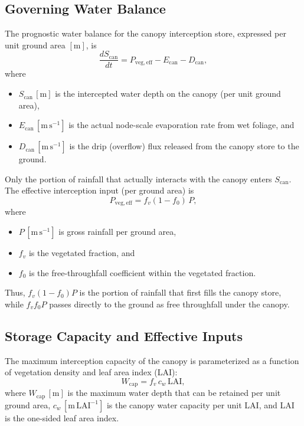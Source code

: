 \documentclass[12pt]{article}
\begin{document}
\subsection{Governing Water Balance}

The prognostic water balance for the canopy interception store, expressed per unit ground area \([\mathrm{m}]\), is
\begin{equation}
\frac{dS_{\mathrm{can}}}{dt}
  = P_{\mathrm{veg,eff}} - E_{\mathrm{can}} - D_{\mathrm{can}},
\label{eq:canopy_balance}
\end{equation}
where
\begin{itemize}
  \item \(S_{\mathrm{can}}\,[\mathrm{m}]\) is the intercepted water depth on the canopy (per unit ground area),
  \item \(E_{\mathrm{can}}\,[\mathrm{m\,s^{-1}}]\) is the actual node-scale evaporation rate from wet foliage, and
  \item \(D_{\mathrm{can}}\,[\mathrm{m\,s^{-1}}]\) is the drip (overflow) flux released from the canopy store to the ground.
\end{itemize}

Only the portion of rainfall that actually interacts with the canopy enters \(S_{\mathrm{can}}\).
The effective interception input (per ground area) is
\begin{equation}
P_{\mathrm{veg,eff}} = f_v (1 - f_0)\,P,
\label{eq:P_veg_eff}
\end{equation}
where
\begin{itemize}
  \item \(P\,[\mathrm{m\,s^{-1}}]\) is gross rainfall per ground area,
  \item \(f_v\) is the vegetated fraction, and
  \item \(f_0\) is the free-throughfall coefficient within the vegetated fraction.
\end{itemize}
Thus, \(f_v(1-f_0)P\) is the portion of rainfall that first fills the canopy store, while \(f_v f_0 P\) passes directly to the ground as free throughfall under the canopy.

\subsection{Storage Capacity and Effective Inputs}

The maximum interception capacity of the canopy is parameterized as a function of vegetation density and leaf area index (LAI):
\begin{equation}
W_{\mathrm{cap}} = f_v \, c_w \, \mathrm{LAI},
\label{eq:Wcap_def}
\end{equation}
where \(W_{\mathrm{cap}}\,[\mathrm{m}]\) is the maximum water depth that can be retained per unit ground area,
\(c_w\,[\mathrm{m\,LAI^{-1}}]\) is the canopy water capacity per unit LAI, and
LAI is the one-sided leaf area index.
\end{document}
